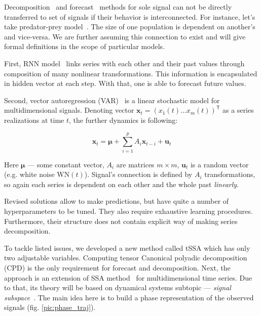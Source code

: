 	Decomposition~\cite{enders2010applied, x11, cleveland90} and forecast~\cite{3b1355aedd1041f1853e609a410576f3, enders2010applied, Box_Jenkins_methodology} methods for sole signal can not be directly transferred to set of signals if their behavior is interconnected. For instance, let's take predator-prey model~\cite{Volterra:1928}. The size of one population is dependent on another's and vice-versa. We are further assuming this connection to exist and will give formal definitions in the scope of particular models. 
	
	First, RNN model~\cite{neco, TEALAB2018334} links series with each other and their past values through composition of many nonlinear transformations. This information is encapsulated in hidden vector at each step. With that, one is able to forecast future values.
	
	Second, vector autoregression (VAR)~\cite{VAR_model1, doi:10.1080/01621459.1962.10480664} is a linear stochastic model for multidimensional signals. Denoting vector $ \mathbf{x}_t = (x_1(t) \ldots x_m(t))^{\mathsf{T}} $ as a series realizations at time $ t $, the further dynamics is following:
	
	\begin{equation*}
		\mathbf{x}_t = \boldsymbol{\mu} + \sum\limits_{i = 1}^p A_i \mathbf{x}_{t - i} + \mathbf{u}_t
	\end{equation*}
	
	Here  $ \boldsymbol{\mu} $ --- some constant vector, $ A_i $ are matrices $ m \times m $, $ \mathbf{u}_t $ is a random vector (e.g. white noise $ \text{WN}(t) $). Signal's connection is defined by $ A_i $ transformations, so again each series is dependent on each other and the whole past \textit{linearly}.
	
	Revised solutions allow to make predictions, but have quite a number of hyperparameters to be tuned. They also require exhaustive learning procedures. Furthermore, their structure does not contain explicit way of making series decomposition.
	
	To tackle listed issues, we developed a new method called tSSA which has only two adjustable variables. Computing tensor Canonical polyadic decomposition (CPD) is the only requirement for forecast and decomposition. Next, the approach is an extension of SSA method~\cite{ecfb9dc578be43ae9ee8fc88b8ff9151} for multidimensional time series. Due to that, its theory will be based on dynamical systems subtopic --- \textit{signal subspace}~\cite{1572261550523548160}. The main idea here is to build a phase representation of the observed signals (fig. \ref{pic:phase_traj}).
	
